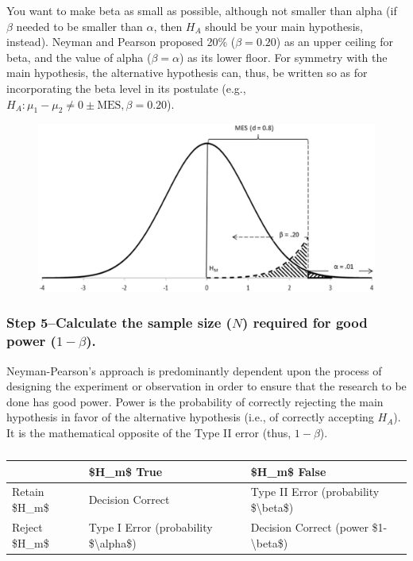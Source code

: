 \documentclass[
]{book}
\theoremstyle{definition}
\theoremstyle{definition}
\theoremstyle{definition}
\theoremstyle{definition}
\theoremstyle{remark}
\begin{document}
You want to make beta as small as possible, although not smaller than alpha (if \(\beta\) needed to be smaller than \(\alpha\), then \(H_A\) should be your main hypothesis, instead). Neyman and Pearson proposed 20\% (\(\beta = 0.20\)) as an upper ceiling for beta, and the value of alpha (\(\beta = \alpha\)) as its lower floor. For symmetry with the main hypothesis, the alternative hypothesis can, thus, be written so as for incorporating the beta level in its postulate (e.g., \(H_A: \mu_1-\mu_2 \neq 0 \pm \mbox{MES}, \beta = 0.20\)).

\begin{figure}

{\centering \includegraphics[width=0.6\linewidth]{images/Perezgonzalez2015Fig4} 

}

\end{figure}

\hypertarget{step-5calculate-the-sample-size-n-required-for-good-power-1-beta.}{%
\subsubsection*{\texorpdfstring{Step 5--Calculate the sample size (\(N\)) required for good power (\(1-\beta\)).}{Step 5--Calculate the sample size (N) required for good power (1-\textbackslash beta).}}\label{step-5calculate-the-sample-size-n-required-for-good-power-1-beta.}}

Neyman-Pearson's approach is predominantly dependent upon the process of designing the experiment or observation in order to ensure that the research to be done has good power. Power is the probability of correctly rejecting the main hypothesis in favor of the alternative hypothesis (i.e., of correctly accepting \(H_A\)). It is the mathematical opposite of the Type II error (thus, \(1-\beta\)).

\begin{table}

\caption{\label{tab:unnamed-chunk-254}}
\centering
\begin{tabular}[t]{lll}
\toprule
  & \$H\_m\$ True & \$H\_m\$ False\\
\midrule
Retain \$H\_m\$ & Decision Correct & Type II Error (probability \$\textbackslash{}beta\$)\\
Reject \$H\_m\$ & Type I Error (probability \$\textbackslash{}alpha\$) & Decision Correct (power \$1-\textbackslash{}beta\$)\\
\bottomrule
\end{tabular}
\end{table}
\end{document}
